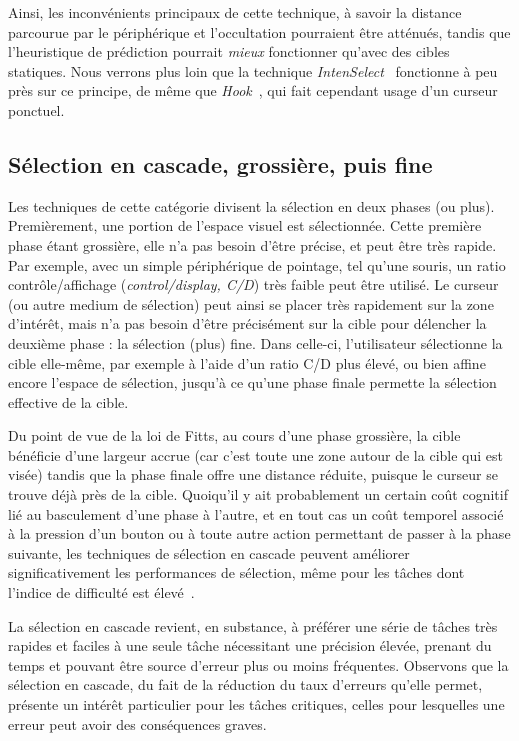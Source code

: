 	Ainsi, les inconvénients principaux de cette technique, à savoir la distance parcourue par le périphérique et l'occultation pourraient être atténués, tandis que l'heuristique de prédiction pourrait \emph{mieux} fonctionner qu'avec des cibles statiques. Nous verrons plus loin que la technique \emph{IntenSelect}~\cite{de2005intenselect} fonctionne à peu près sur ce principe, de même que \emph{Hook}~\cite{ortega2013hook}, qui fait cependant usage d'un curseur ponctuel.

	\subsection{Sélection en cascade, grossière, puis fine}
	Les techniques de cette catégorie divisent la sélection en deux phases (ou plus). Premièrement, une portion de l'espace visuel est sélectionnée. Cette première phase étant grossière, elle n'a pas besoin d'être précise, et peut être très rapide. Par exemple, avec un simple périphérique de pointage, tel qu'une souris, un ratio contrôle/affichage (\emph{control/display, C/D}) très faible peut être utilisé. Le curseur (ou autre medium de sélection) peut ainsi se placer très rapidement sur la zone d'intérêt, mais n'a pas besoin d'être précisément sur la cible pour délencher la deuxième phase : la sélection (plus) fine. Dans celle-ci, l'utilisateur sélectionne la cible elle-même, par exemple à l'aide d'un ratio C/D plus élevé, ou bien affine encore l'espace de sélection, jusqu'à ce qu'une phase finale permette la sélection effective de la cible.
	 
	Du point de vue de la loi de Fitts, au cours d'une phase grossière, la cible bénéficie d'une largeur accrue (car c'est toute une zone autour de la cible qui est visée) tandis que la phase finale offre une distance réduite, puisque le curseur se trouve déjà près de la cible. Quoiqu'il y ait probablement un certain \og coût cognitif \fg{} lié au basculement d'une phase à l'autre, et en tout cas un coût temporel associé à la pression d'un bouton ou à toute autre action permettant de passer à la phase suivante, les techniques de sélection en cascade peuvent améliorer significativement les performances de sélection, même pour les tâches dont l'indice de difficulté est élevé~\cite{kopper2011rapid}.
	
	La sélection en cascade revient, en substance, à préférer une série de tâches très rapides et faciles à une seule tâche nécessitant une précision élevée, prenant du temps et pouvant être source d'erreur plus ou moins fréquentes. Observons que la sélection en cascade, du fait de la réduction du taux d'erreurs qu'elle permet, présente un intérêt particulier pour les tâches critiques, celles pour lesquelles une erreur peut avoir des conséquences graves.
	
